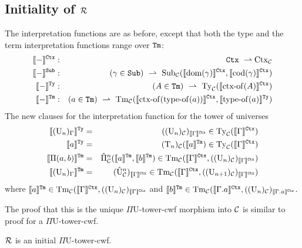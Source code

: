 \documentclass{lmcs}
\def\UU{\mathrm{U}}
\def\Ta{\mathrm{T}}
\def\Pihat{\hat{\Pi}}
\def\UUhat{\hat{\UU}}
\newcommand{\intCtxU}[1]{\llbracket #1 \rrbracket^\RawCtx}
\newcommand{\intSubU}[1]{\llbracket #1 \rrbracket^\RawSub}
\newcommand{\intTyU}[1]{\llbracket #1 \rrbracket^\RawTy}
\newcommand{\intTmU}[1]{\llbracket #1 \rrbracket^\RawTm}
\begin{document}
\subsection{Initiality of $\mathcal{R}$}
The interpretation functions are as before, except that both the type and the term interpretation functions range over ${\tt Tm}$:
\begin{eqnarray*}
\intCtxU{-} &:& \RawCtx\ \rightharpoonup \Ctx_\C\\
\intSubU{-}&:& (\gamma \in \RawSub)\ \rightharpoonup \
\Sub_\C(\intCtxU{\domain(\gamma)}, \intCtxU{\codomain(\gamma)})\\
\intTyU{-}&:& (A \in \RawTm)\ \rightharpoonup\ \Ty_\C(\intCtxU{\ctxof(A)})\\
\intTmU{-}&:& (a \in\RawTm)\ \rightharpoonup\
\Tm_\C (\intCtxU{\ctxof(\typeof(a))}, \intTyU{\typeof(a)})
\end{eqnarray*}
The new clauses for the interpretation function for the tower of universes
\begin{eqnarray*}
\intTyU{(\UU_n)_\Gamma} &=& ((\UU_n)_\C)_{\intCtxU{\Gamma}} \in \Ty_\C(\intCtxU{\Gamma})\\
\intTyU{a} &=& (\Ta_n)_\C(\intTmU{a}) \in \Ty_\C(\intCtxU{\Gamma})\\
\intTmU{\Pi(a,b)}&=& \Pihat^n_\C(\intTmU{a},\intTmU{b}) \in \Tm_\C(\intCtxU{\Gamma},((\UU_n)_\C)_{\intCtxU{\Gamma}})\\
\intTmU{(\UU_n)_\Gamma} &=& (\UUhat^n_\C)_{\intCtxU{\Gamma}} \in \Tm_\C(\intCtxU{\Gamma},((\UU_{n+1})_\C)_{\intCtxU{\Gamma}})
\end{eqnarray*}
where 
$\intTmU{a} \in \Tm_\C(\intCtxU{\Gamma},((\UU_n)_\C)_{\intCtxU{\Gamma}}$ and 
$\intTmU{b} \in \Tm_\C(\intCtxU{\Gamma.a},((\UU_n)_\C)_{\intCtxU{\Gamma.a}}$.

The proof that this is the unique $\Pi\UU$-tower-cwf morphism into ${\mathcal C}$ is similar to proof for a $\Pi\UU$-tower-cwf. 


\begin{thm}\label{theom:initial_cwf}
  $\mathcal{R}$ is an initial $\Pi\UU$-tower-cwf.
\end{thm}



\end{document}
